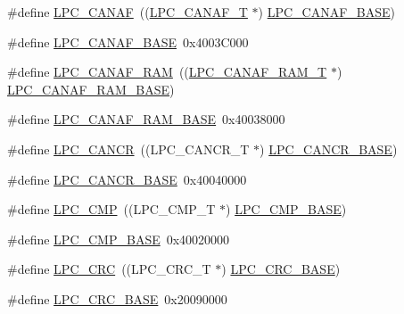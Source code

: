 \begin{DoxyCompactItemize}
\#define \hyperlink{group__PERIPH__407X__8X__BASE_ga4f738c971938302f38d54e662c9f7774}{L\+P\+C\+\_\+\+C\+A\+N\+AF}~((\hyperlink{structLPC__CANAF__T}{L\+P\+C\+\_\+\+C\+A\+N\+A\+F\+\_\+T}            $\ast$) \hyperlink{group__PERIPH__407X__8X__BASE_gabc6943f9e943d63ecf4e236b4ce7c344}{L\+P\+C\+\_\+\+C\+A\+N\+A\+F\+\_\+\+B\+A\+SE})
\item 
\#define \hyperlink{group__PERIPH__407X__8X__BASE_gabc6943f9e943d63ecf4e236b4ce7c344}{L\+P\+C\+\_\+\+C\+A\+N\+A\+F\+\_\+\+B\+A\+SE}~0x4003\+C000
\item 
\#define \hyperlink{group__PERIPH__407X__8X__BASE_gaf02b7bcdc41a045910b3f0bae8a8f4b0}{L\+P\+C\+\_\+\+C\+A\+N\+A\+F\+\_\+\+R\+AM}~((\hyperlink{structLPC__CANAF__RAM__T}{L\+P\+C\+\_\+\+C\+A\+N\+A\+F\+\_\+\+R\+A\+M\+\_\+T}        $\ast$) \hyperlink{group__PERIPH__407X__8X__BASE_ga9d4f2bac61e26b32ad64d62f2be50e49}{L\+P\+C\+\_\+\+C\+A\+N\+A\+F\+\_\+\+R\+A\+M\+\_\+\+B\+A\+SE})
\item 
\#define \hyperlink{group__PERIPH__407X__8X__BASE_ga9d4f2bac61e26b32ad64d62f2be50e49}{L\+P\+C\+\_\+\+C\+A\+N\+A\+F\+\_\+\+R\+A\+M\+\_\+\+B\+A\+SE}~0x40038000
\item 
\#define \hyperlink{group__PERIPH__407X__8X__BASE_gadc209557a5736e29149b96018056fc29}{L\+P\+C\+\_\+\+C\+A\+N\+CR}~((L\+P\+C\+\_\+\+C\+A\+N\+C\+R\+\_\+T            $\ast$) \hyperlink{group__PERIPH__407X__8X__BASE_gac22b88e108d620661add143c174f8f11}{L\+P\+C\+\_\+\+C\+A\+N\+C\+R\+\_\+\+B\+A\+SE})
\item 
\#define \hyperlink{group__PERIPH__407X__8X__BASE_gac22b88e108d620661add143c174f8f11}{L\+P\+C\+\_\+\+C\+A\+N\+C\+R\+\_\+\+B\+A\+SE}~0x40040000
\item 
\#define \hyperlink{group__PERIPH__407X__8X__BASE_gabc29cea39fbacdfa61a79b4c082e68ad}{L\+P\+C\+\_\+\+C\+MP}~((L\+P\+C\+\_\+\+C\+M\+P\+\_\+T              $\ast$) \hyperlink{group__PERIPH__407X__8X__BASE_ga571228b687abe77c6e72bdbe00cf60a3}{L\+P\+C\+\_\+\+C\+M\+P\+\_\+\+B\+A\+SE})
\item 
\#define \hyperlink{group__PERIPH__407X__8X__BASE_ga571228b687abe77c6e72bdbe00cf60a3}{L\+P\+C\+\_\+\+C\+M\+P\+\_\+\+B\+A\+SE}~0x40020000
\item 
\#define \hyperlink{group__PERIPH__407X__8X__BASE_gaf01f4835164b4abd2dcc9d89a66ffc21}{L\+P\+C\+\_\+\+C\+RC}~((L\+P\+C\+\_\+\+C\+R\+C\+\_\+T              $\ast$) \hyperlink{group__PERIPH__407X__8X__BASE_ga6d27804148d49c67065a8cd351ebc7b7}{L\+P\+C\+\_\+\+C\+R\+C\+\_\+\+B\+A\+SE})
\item 
\#define \hyperlink{group__PERIPH__407X__8X__BASE_ga6d27804148d49c67065a8cd351ebc7b7}{L\+P\+C\+\_\+\+C\+R\+C\+\_\+\+B\+A\+SE}~0x20090000

\end{DoxyCompactItemize}
